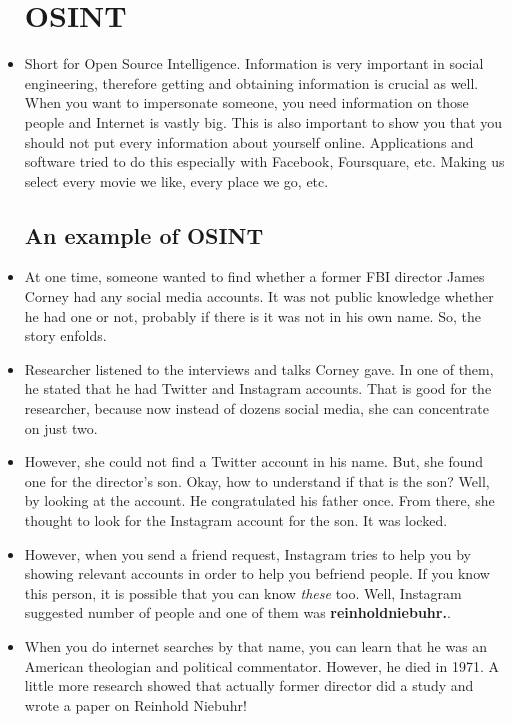 \documentclass[12pt]{article}
\newcommand{\blue}[1]{{\color{blue} #1}}
\begin{document}
\begin{itemize}[itemsep=3em]
	\newpage
	\section{OSINT}
	
	\item Short for Open Source Intelligence. Information is very important in social engineering, therefore getting and obtaining information is crucial as well. When you want to impersonate someone, you need information on those people and Internet is vastly big. \small \blue{This is also important to show you that you should not put every information about yourself online. Applications and software tried to do this especially with Facebook, Foursquare, etc. Making us select every movie we like, every place we go, etc.}
	
	\LARGE
	
	\subsection{An example of OSINT}
	
	\item At one time, someone wanted to find whether a former FBI director James Corney had any social media accounts. It was not public knowledge whether he had one or not, probably if there is it was not in his own name. So, the story enfolds.
	
	\item Researcher listened to the interviews and talks Corney gave. In one of them, he stated that he had Twitter and Instagram accounts. That is good for the researcher, because now instead of dozens social media, she can concentrate on just two. 
	
	\item However, she could not find a Twitter account in his name. But, she found one for the director's son. Okay, how to understand if that is the son? Well, by looking at the account. He congratulated his father once. From there, she thought to look for the Instagram account for the son. It was locked.
	
	\item However, when you send a friend request, Instagram tries to help you by showing relevant accounts in order to help you befriend people. If you know this person, it is possible that you can know \textit{these} too. Well, Instagram suggested number of people and one of them was \textbf{reinholdniebuhr.}.
	
	\item When you do internet searches by that name, you can learn that he was an American theologian and political commentator. However, he died in 1971. A little more research showed that actually former director did a study and wrote a paper on Reinhold Niebuhr!
	

\end{itemize}
\end{document}
